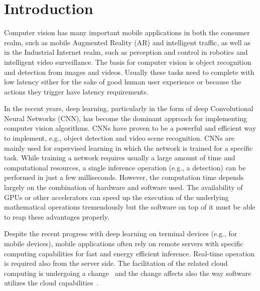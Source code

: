 \documentclass[sigconf]{acmart}
\begin{document}


\maketitle

\section{Introduction}

Computer vision has many important mobile applications in both the consumer realm, such as mobile Augmented Reality (AR) and intelligent traffic, as well as in the Industrial Internet realm, such as perception and control in robotics and intelligent video surveillance.
The basis for computer vision is object recognition and detection from images and videos. Usually these tasks need to complete with low latency either for the sake of good human user experience or because the actions they trigger have latency requirements.

In the recent years, deep learning, particularly in the form of deep Convolutional Neural Networks (CNN), has become the dominant approach for implementing computer vision algorithms\cite{lecun15nature}. CNNs have proven to be a powerful and efficient way to implement, e.g., object detection and video scene recognition. CNNs are mainly used for supervised learning in which the network is trained for a specific task. While training a network requires usually a large amount of time and computational resources, a single inference operation (e.g., a detection) can be performed in just a few milliseconds\cite{redmon16CVPR}. However, the computation time depends largely on the combination of hardware and software used. The availability of GPUs or other accelerators can speed up the execution of the underlying mathematical operations tremendously but the software on top of it must be able to reap these advantages properly.

Despite the recent progress with deep learning on terminal devices (e.g., \cite{lane16deepx} for mobile devices), mobile applications often rely on remote servers with specific computing capabilities for fast and energy efficient inference. Real-time operation \cite{nishihara2017realtime} is required also from the server side. The facilitation of the related cloud computing is undergoing a change~\cite{yi15mobidata} and the change affects also the way software utilizes the cloud capabilities~\cite{maas2017cloud30}.
\end{document}
